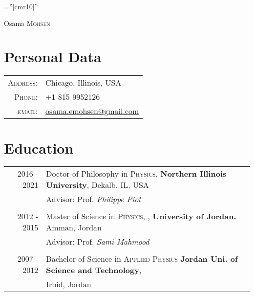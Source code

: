 \documentclass[a4paper,10pt]{article}
\begin{document}

\pagestyle{empty} %

\font\fb=''[cmr10]'' %

\par{\centering
		{\Huge Osama   \textsc{Mohsen}
	}\bigskip\par}

\section{Personal Data}

\begin{tabular}{rl}
    \textsc{Address:}  &  Chicago, Illinois, USA \\
    \textsc{Phone:}     & +1 815 9952126\\
    \textsc{email:}     & \href{mailto:omohsen@niu.edu}{osama.emohsen@gmail.com}
\end{tabular}


\section{Education}
\begin{tabular}{rl}	
2016 - 2021  & Doctor of Philosophy in \textsc{Physics}, \small \textbf{Northern Illinois University}, Dekalb, IL, USA\\
& Advisor: Prof. \textit{ Philippe Piot} \\
\vspace{0.1cm} \\
2012 - 2015& Master of Science in \textsc{Physics}, , \small \textbf{University of Jordan.} Amman, Jordan\\ 
&  Advisor: Prof. \textit{Sami Mahmood}\\
\vspace{0.1cm} \\
2007 - 2012 & Bachelor of Science in \textsc{Applied Physics} \small \textbf{Jordan Uni. of Science and Technology}, 
\\ & Irbid, Jordan \\

\end{tabular}
\end{document}
